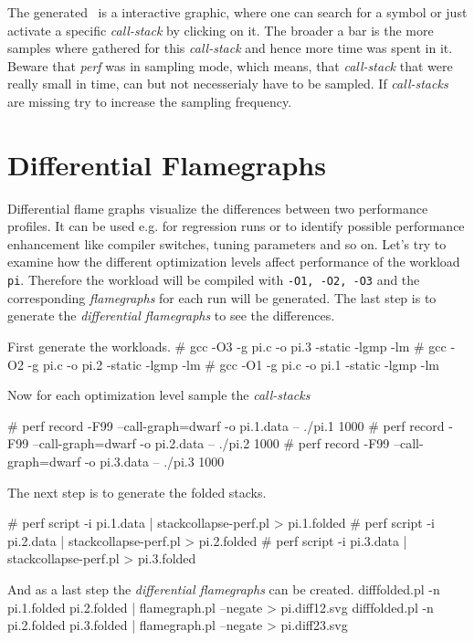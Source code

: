 {{\setupcaption [figure][location={bottom}]
\startplacefigure[title={Complete Flamegraph of {\tt pi}}]
\externalfigure[pi.svg][fullwidth]
\stopplacefigure

The generated \SVG\ is a interactive graphic, where one can search for
a symbol or just activate a specific {\em call-stack} by clicking on
it. The broader a bar is the more samples where gathered for this {\em
  call-stack} and hence more time was spent in it. Beware that {\em
  perf} was in sampling mode, which means, that {\em call-stack} that
were really small in time, can but not necesserialy have to be
sampled. If {\em call-stacks} are missing try to increase the sampling
frequency.


\section{Differential Flamegraphs}
Differential flame graphs visualize the differences between two
performance profiles. It can be used e.g. for regression runs or to
identify possible performance enhancement like compiler switches,
tuning parameters and so on. Let's try to examine how the different
optimization levels affect performance of the workload {\tt
  pi}. Therefore the workload will be compiled with {\tt -O1, -O2,
  -O3} and the corresponding {\em flamegraphs} for each run will be
generated. The last step is to generate the {\em differential
  flamegraphs} to see the differences.

First generate the workloads.
\starttyping
# gcc -O3 -g pi.c -o pi.3 -static -lgmp -lm
# gcc -O2 -g pi.c -o pi.2 -static -lgmp -lm
# gcc -O1 -g pi.c -o pi.1 -static -lgmp -lm
\stoptyping

Now for each optimization level sample the {\em call-stacks}

\starttyping
# perf record -F99 --call-graph=dwarf -o pi.1.data -- ./pi.1 1000
# perf record -F99 --call-graph=dwarf -o pi.2.data -- ./pi.2 1000
# perf record -F99 --call-graph=dwarf -o pi.3.data -- ./pi.3 1000
\stoptyping

The next step is to generate the folded stacks.

\starttyping
# perf script -i pi.1.data | stackcollapse-perf.pl > pi.1.folded
# perf script -i pi.2.data | stackcollapse-perf.pl > pi.2.folded
# perf script -i pi.3.data | stackcollapse-perf.pl > pi.3.folded
\stoptyping

And as a last step the {\em differential flamegraphs} can be created.
\starttyping
difffolded.pl -n pi.1.folded pi.2.folded | flamegraph.pl --negate > pi.diff12.svg
difffolded.pl -n pi.2.folded pi.3.folded | flamegraph.pl --negate > pi.diff23.svg
\stoptyping


}}
